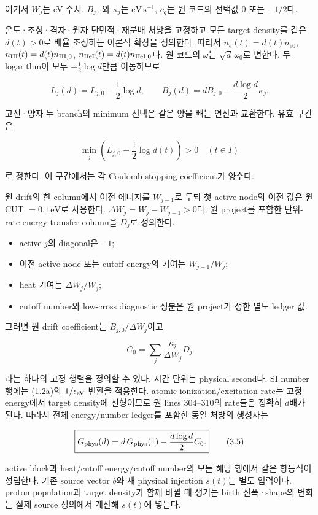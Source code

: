 여기서 \(W_j\)는 eV 수치, \(B_{j,0}\)와 \(\kappa_j\)는 \(\mathrm{eV\,s^{-1}}\), \(c_q\)는 원 코드의 선택값 0 또는 \(-1/2\)다.

온도·조성·격자·원자 단면적·재분배 처방을 고정하고 모든 target density를 같은 \(d(t)>0\)로 배율 조정하는 이론적 확장을 정의한다. 따라서 \(n_e(t)=d(t)n_{e0}\), \(n_{\rm HI}(t)=d(t)n_{\rm HI,0}\), \(n_{\rm HeI}(t)=d(t)n_{\rm HeI,0}\)다. 원 코드의 \(\omega\)는 \(\sqrt d\,\omega_0\)로 변한다. 두 logarithm이 모두 \(-\tfrac12\log d\)만큼 이동하므로

\[
\boxed{
L_j(d)=L_{j,0}-\frac12\log d,\qquad
B_j(d)=d B_{j,0}-\frac{d\log d}{2}\kappa_j.
}
\tag{3.2}
\]

고전·양자 두 branch의 minimum 선택은 같은 양을 빼는 연산과 교환한다. 유효 구간은

\[
\boxed{
\min_j\left(L_{j,0}-\frac12\log d(t)\right)>0
\quad(t\in I)
}
\tag{3.3}
\]

로 정한다. 이 구간에서는 각 Coulomb stopping coefficient가 양수다.

원 drift의 한 column에서 이전 에너지를 \(W_{j-1}\)로 두되 첫 active node의 이전 값은 원 CUT \(=0.1\,\mathrm{eV}\)로 사용한다. \(\Delta W_j=W_j-W_{j-1}>0\)다. 원 project를 포함한 단위-rate energy transfer column을 \(D_j\)로 정의한다.

\begin{itemize}
\tightlist
\item
  active \(j\)의 diagonal은 \(-1\);
\item
  이전 active node 또는 cutoff energy의 기여는 \(W_{j-1}/W_j\);
\item
  heat 기여는 \(\Delta W_j/W_j\);
\item
  cutoff number와 low-cross diagnostic 성분은 원 project가 정한 별도 ledger 값.
\end{itemize}

그러면 원 drift coefficient는 \(B_{j,0}/\Delta W_j\)이고

\[
C_0=\sum_j\frac{\kappa_j}{\Delta W_j}D_j
\tag{3.4}
\]

라는 하나의 고정 행렬을 정의할 수 있다. 시간 단위는 physical second다. SI number 행에는 (1.2a)의 \(1/\epsilon_{\rm eV}\) 변환을 적용한다. atomic ionization/excitation rate는 고정 energy에서 target density에 선형이므로 원 lines 304--310의 rate들은 정확히 \(d\)배가 된다. 따라서 전체 energy/number ledger를 포함한 동일 처방의 생성자는

\[
\boxed{
G_{\rm phys}(d)
=d\,G_{\rm phys}(1)-\frac{d\log d}{2}C_0.
}
\tag{3.5}
\]

active block과 heat/cutoff energy/cutoff number의 모든 해당 행에서 같은 항등식이 성립한다. 기존 source vector \(b\)와 새 physical injection \(s(t)\)는 별도 입력이다. proton population과 target density가 함께 바뀔 때 생기는 birth 진폭·shape의 변화는 실제 source 정의에서 계산해 \(s(t)\)에 넣는다.

